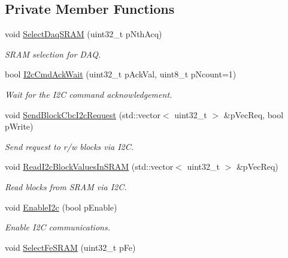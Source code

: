 \subsection*{Private Member Functions}
\begin{CompactItemize}
\item 
void \hyperlink{class_ph2___hw_interface_1_1_glib_f_w_interface_0b6b576606e87a52598c3dd3b314c62e}{Select\-Daq\-SRAM} (uint32\_\-t p\-Nth\-Acq)
\begin{CompactList}\small\item\em SRAM selection for DAQ. \item\end{CompactList}\item 
bool \hyperlink{class_ph2___hw_interface_1_1_glib_f_w_interface_a43ddde3db1e03ed001bda27a2acf7e1}{I2c\-Cmd\-Ack\-Wait} (uint32\_\-t p\-Ack\-Val, uint8\_\-t p\-Ncount=1)
\begin{CompactList}\small\item\em Wait for the I2C command acknowledgement. \item\end{CompactList}\item 
void \hyperlink{class_ph2___hw_interface_1_1_glib_f_w_interface_17a0f55fc06cc6f0b334f7debcf733d3}{Send\-Block\-Cbc\-I2c\-Request} (std::vector$<$ uint32\_\-t $>$ \&p\-Vec\-Req, bool p\-Write)
\begin{CompactList}\small\item\em Send request to r/w blocks via I2C. \item\end{CompactList}\item 
void \hyperlink{class_ph2___hw_interface_1_1_glib_f_w_interface_e067b85741fbb52c30a946d5f4f2691b}{Read\-I2c\-Block\-Values\-In\-SRAM} (std::vector$<$ uint32\_\-t $>$ \&p\-Vec\-Req)
\begin{CompactList}\small\item\em Read blocks from SRAM via I2C. \item\end{CompactList}\item 
void \hyperlink{class_ph2___hw_interface_1_1_glib_f_w_interface_bb8f5593c61f54a35a2a7f99b3d6ca55}{Enable\-I2c} (bool p\-Enable)
\begin{CompactList}\small\item\em Enable I2C communications. \item\end{CompactList}\item 
void \hyperlink{class_ph2___hw_interface_1_1_glib_f_w_interface_d7974fd2dee37135dc6cc3997d083037}{Select\-Fe\-SRAM} (uint32\_\-t p\-Fe)
\end{CompactItemize}
